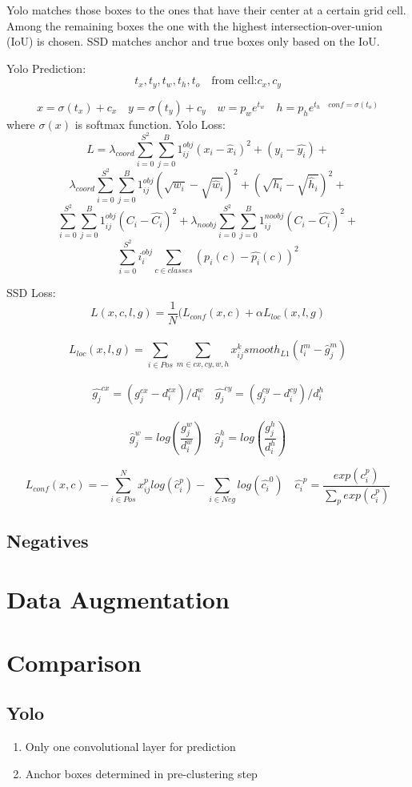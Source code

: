 \documentclass{article}
\begin{document}
Yolo matches those boxes to the ones that have their center at a certain grid cell. Among the remaining boxes the one with the highest intersection-over-union (IoU) is chosen. SSD matches anchor and true boxes only based on the IoU.

Yolo Prediction:
$$t_x,t_y,t_w,t_h,t_o \quad \text{from cell:} c_x, c_y$$

$$x = \sigma(t_x) + c_x \quad y = \sigma(t_y) + c_y \quad w = p_w e^{t_w} \quad h = p_he^{t_h \quad conf = \sigma(t_o)}$$
where $\sigma(x)$ is softmax function.
Yolo Loss:\\
$$ L = \lambda_{coord} \sum_{i=0}^{S^2}\sum_{j=0}^{B} 1^{obj}_{ij}(x_i - \hat{x}_i)^2 + (y_i - \hat{y_i})+$$
$$
\lambda_{coord} \sum_{i=0}^{S^2}\sum_{j=0}^{B} 1^{obj}_{ij}(\sqrt{w_i} - \sqrt{\hat{w}_i})^2 + (\sqrt{h_i} - \sqrt{\hat{h}_i})^2 +$$ 
$$\sum_{i=0}^{S^2}\sum_{j=0}^{B} 1^{obj}_{ij} (C_i - \hat{C_i})^2
+ 
\lambda_{noobj} \sum_{i=0}^{S^2}\sum_{j=0}^{B} 1^{noobj}_{ij} (C_i - \hat{C_i})^2
+ $$$$
\sum_{i=0}^{S^2}i_i^{obj} \sum_{c \in classes}(p_i(c) - \hat{p_i}(c))^2$$

SSD Loss:\\
$$L(x,c,l,g) = \frac{1}{N} (L_{conf}(x,c) +\alpha L_{loc}(x,l,g)$$\\
$$L_{loc}(x,l,g) = \sum_{i \in Pos}\sum_{m \in {cx,cy,w,h}} x_{ij}^k smooth_{L1} (l_i^m - \hat{g}^m_j)$$\\
$$\hat{g_j}^{cx} = (g_j^{cx} - d_i^{cx})/d_i^{w} \quad \hat{g_j}^{cy} = (g_j^{cy} - d_i^{cy})/d_i^{h}$$\\
$$\hat{g}_j^w = log(\frac{g_j^w}{d_i^w}) \quad \hat{g}_j^h = log(\frac{g_j^h}{d_i^h})$$

$$L_{conf}(x,c) = - \sum_{i \in Pos}^{N} x_{ij}^p log(\hat{c}_i^p) - \sum_{i \in Neg} log(\hat{c_i}^0) \quad \hat{c_i}^p = \frac{exp(c_i^p)}{\sum_{p} exp(c_i^p)}$$
\subsection{Negatives}

\section{Data Augmentation}

\section{Comparison}
\subsection{Yolo}
\begin{enumerate}
	\item Only one convolutional layer for prediction
	\item Anchor boxes determined in pre-clustering step
\end{enumerate}
\end{document}
